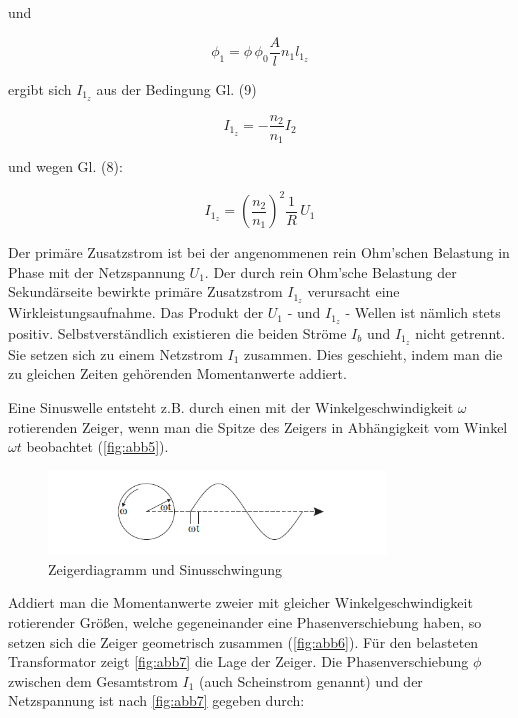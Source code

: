\documentclass[11pt,ngerman]{scrartcl}
\begin{document}
und

\begin{equation}
	\phi_1 = \phi\, \phi_0 \frac{A}{l}n_1 l_{1_z}
\end{equation}

ergibt sich $I_{1_z}$ aus der Bedingung Gl. (9)

\begin{equation}
	I_{1_z} = - \frac{n_2}{n_1} I_2
\end{equation}

und wegen Gl. (8):

\begin{equation}
	I_{1_z} = \left(\frac{n_2}{n_1}\right)^2 \frac{1}{R} \, U_1
\end{equation}

Der primäre Zusatzstrom ist bei der angenommenen rein Ohm’schen Belastung in Phase mit
der Netzspannung $U_1$. Der durch rein Ohm’sche Belastung der Sekundärseite bewirkte primäre
Zusatzstrom $I_{1_z}$ verursacht eine Wirkleistungsaufnahme. Das Produkt der $U_1$ - und $I_{1_z}$ - Wellen ist
nämlich stets positiv. Selbstverständlich existieren die beiden Ströme $I_b$ und $I_{1_z}$ nicht getrennt.
Sie setzen sich zu einem Netzstrom $I_1$ zusammen. Dies geschieht, indem man die zu gleichen
Zeiten gehörenden Momentanwerte addiert.

Eine Sinuswelle entsteht z.B. durch einen mit der Winkelgeschwindigkeit $\omega$ rotierenden Zeiger,
wenn man die Spitze des Zeigers in Abhängigkeit vom Winkel $\omega t$ beobachtet (\autoref{fig:abb5}).

\begin{figure}[H]
	\begin{center}
		\includegraphics[width=0.8\textwidth]{abb5}
	\end{center}
	\caption{Zeigerdiagramm und Sinusschwingung}
	\label{fig:abb5}
\end{figure}

Addiert man die Momentanwerte zweier mit gleicher Winkelgeschwindigkeit rotierender Größen,
welche gegeneinander eine Phasenverschiebung haben, so setzen sich die Zeiger geometrisch zusammen
(\autoref{fig:abb6}). Für den belasteten Transformator zeigt \autoref{fig:abb7} die Lage der Zeiger. Die
Phasenverschiebung $\phi$ zwischen dem Gesamtstrom $I_1$ (auch Scheinstrom genannt) und der Netzspannung
ist nach \autoref{fig:abb7} gegeben durch:
\end{document}
